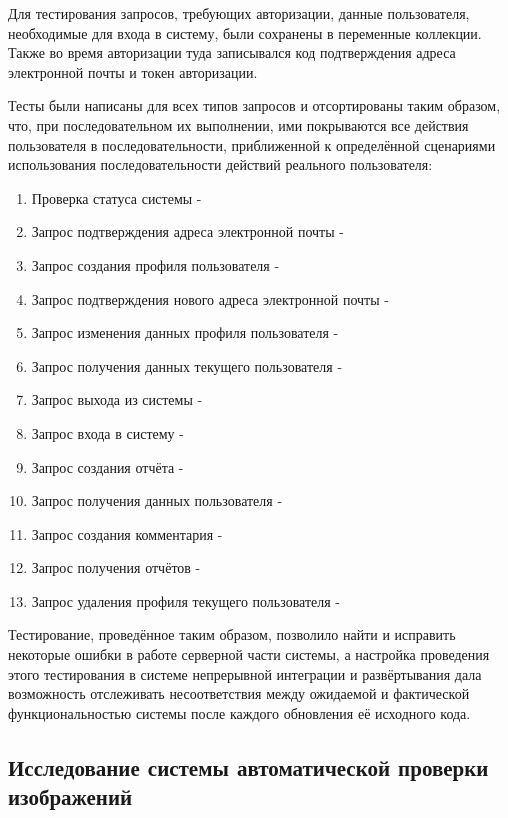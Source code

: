 \tab
Для тестирования запросов, требующих авторизации, данные пользователя, необходимые для входа в систему, были сохранены в переменные коллекции.
Также во время авторизации туда записывался код подтверждения адреса электронной почты и токен авторизации.

\tab
Тесты были написаны для всех типов запросов и отсортированы таким образом, что, при последовательном их выполнении, ими покрываются все действия пользователя в последовательности, приближенной к определённой сценариями использования последовательности действий реального пользователя:
\begin{enumerate}
	\item Проверка статуса системы - 
	\item Запрос подтверждения адреса электронной почты - 
	\item Запрос создания профиля пользователя - 
	\item Запрос подтверждения нового адреса электронной почты - 
	\item Запрос изменения данных профиля пользователя - 
	\item Запрос получения данных текущего пользователя - 
	\item Запрос выхода из системы - 
	\item Запрос входа в систему - 
	\item Запрос создания отчёта - 
	\item Запрос получения данных пользователя - 
	\item Запрос создания комментария - 
	\item Запрос получения отчётов - 
	\item Запрос удаления профиля текущего пользователя - 
\end{enumerate}

\tab
Тестирование, проведённое таким образом, позволило найти и исправить некоторые ошибки в работе серверной части системы, а настройка проведения этого тестирования в системе непрерывной интеграции и развёртывания дала возможность отслеживать несоответствия между ожидаемой и фактической функциональностью системы после каждого обновления её исходного кода.

\subsection{Исследование системы автоматической проверки изображений}


